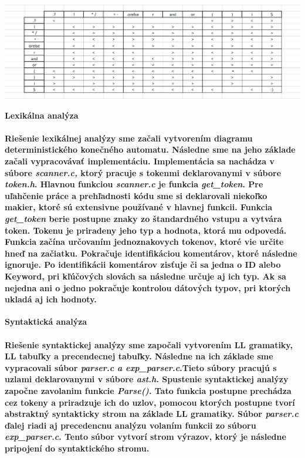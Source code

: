 \documentclass[12pt]{article}
\begin{document}
\includegraphics[width=\textwidth,scale=0.3]{Ptabulka}


\newpage

 \Large \textbf{Lexikálna analýza} \normalsize \\
\noindent\makebox[\linewidth]{\rule{\textwidth}{0.4pt}}

\paragraph{\indent Riešenie lexikálnej analýzy sme začali vytvorením diagramu deterministického konečného automatu. Následne sme na jeho základe začali vypracovávať implementáciu. Implementácia sa nachádza v súbore \textit{scanner.c,} ktorý pracuje s tokenmi deklarovanymi v súbore \textit{token.h}. Hlavnou funkciou \textit{scanner.c} je funkcia \textit{get\_token}. Pre uľahčenie práce a prehľadnosti kódu sme si deklarovali niekoľko makier, ktoré sú extensivne používané v hlavnej funkcii. Funkcia \textit{get\_token} berie postupne znaky zo štandardného vstupu a vytvára token. Tokenu je priradeny jeho typ a hodnota, ktorá mu odpovedá. Funkcia začína určovaním jednoznakovych tokenov, ktoré vie určite hneď na začiatku. Pokračuje identifikáciou komentárov, ktoré následne ignoruje. Po identifikácii komentárov zisťuje či sa jedna o ID alebo Keyword, pri kľúčových slovách sa následne určuje aj ich typ. Ak sa nejedna ani o jedno pokračuje kontrolou dátových typov, pri ktorých ukladá aj ich hodnoty.  \newline \\}

 \Large \textbf{Syntaktická analýza}\normalsize \\
\noindent\makebox[\linewidth]{\rule{\textwidth}{0.4pt}}

\paragraph{Riešenie syntaktickej analýzy sme započali vytvorením LL gramatiky, LL tabuľky a precendecnej tabuľky. Následne na ich základe sme vypracovali súbor \textit{parser.c a exp\_parser.c}.Tieto súbory pracujú s uzlami deklarovanymi v súbore \textit{ast.h}. Spustenie syntaktickej analýzy započne zavolanim funkcie \textit{Parse()}. Tato funkcia postupne prechádza cez tokeny a priradzuje ich do uzlov, pomocou ktorých postupne tvorí abstraktný syntakticky strom na základe LL gramatiky. Súbor \textit{parser.c} ďalej riadi aj precedencnu analýzu volaním funkcii zo súboru \textit{exp\_parser.c}. Tento súbor vytvorí strom výrazov, ktorý je následne pripojení do syntaktického stromu.  \newline \\}
\end{document}
